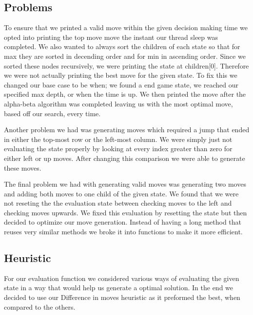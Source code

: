 \documentclass[12pt]{article}
\begin{document}
\subsection*{Problems}
To ensure that we printed a valid move within the given decision making time we opted into printing the top move move the instant our thread sleep was completed.
We also wanted to always sort the children of each state so that for max they are sorted in decending order and for min in ascending order.
Since we sorted these nodes recursively, we were printing the state at children[0].
Therefore we were not actually printing the best move for the given state.
To fix this we changed our base case to be when; we found a end game state, we reached our specified max depth, or when the time is up.
We then printed the move after the alpha-beta algorithm was completed leaving us with the most optimal move, based off our search,  every time.

Another problem we had was generating moves which required a jump that ended in either the top-most row or the left-most column.
We were simply just not evaluating the state properly by looking at every index greater than zero for either left or up moves.
After changing this comparison we were able to generate these moves.
 
The final problem we had with generating valid moves was generating two moves and adding both moves to one child of the given state.
We found that we were not reseting the the evaluation state between checking moves to the left and checking moves upwards.
We fixed this evaluation by resetting the state but then decided to optimize our move generation.
Instead of having a long method that reuses very similar methods we broke it into functions to make it more efficient.

\subsection*{Heuristic}
For our evaluation function we considered various ways of evaluating the given state in a way that would help us generate a optimal solution.
In the end we decided to use our Difference in moves heuristic as it preformed the best, when compared to the others.
\end{document}
